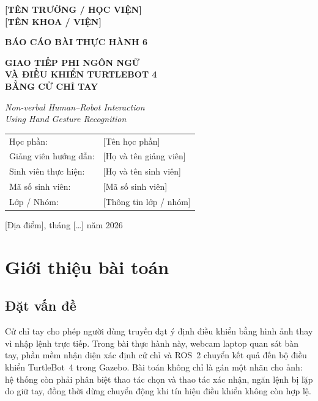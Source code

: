 \documentclass[12pt,a4paper]{article}
\begin{document}
\hypersetup{pageanchor=false}
\begin{titlepage}
\thispagestyle{empty}
\centering
{\large\bfseries [TÊN TRƯỜNG / HỌC VIỆN]\\[5pt] [TÊN KHOA / VIỆN]}\par
\vspace{1.5cm}
{\Large\bfseries BÁO CÁO BÀI THỰC HÀNH 6}\par
\vspace{0.7cm}
{\LARGE\bfseries\color{navy} GIAO TIẾP PHI NGÔN NGỮ\\[7pt] VÀ ĐIỀU KHIỂN TURTLEBOT 4\\[7pt] BẰNG CỬ CHỈ TAY}\par
\vspace{0.6cm}
{\large\itshape Non-verbal Human--Robot Interaction\\ Using Hand Gesture Recognition}\par
\vspace{1.6cm}
\begin{tabular}{@{}ll@{}}
Học phần: & [Tên học phần]\\[9pt]
Giảng viên hướng dẫn: & [Họ và tên giảng viên]\\[9pt]
Sinh viên thực hiện: & [Họ và tên sinh viên]\\[9pt]
Mã số sinh viên: & [Mã số sinh viên]\\[9pt]
Lớp / Nhóm: & [Thông tin lớp / nhóm]
\end{tabular}
\vfill
{\large [Địa điểm], tháng [\ldots] năm 2026}\par
\vspace{0.4cm}
\end{titlepage}
\hypersetup{pageanchor=true}
{\setlength{\parskip}{0pt}\renewcommand{\baselinestretch}{0.96}\footnotesize\tableofcontents}
\clearpage
{}

\section{Giới thiệu bài toán}
\subsection{Đặt vấn đề}
Cử chỉ tay cho phép người dùng truyền đạt ý định điều khiển bằng hình ảnh thay vì nhập lệnh trực tiếp. Trong bài thực hành này, webcam laptop quan sát bàn tay, phần mềm nhận diện xác định cử chỉ và ROS~2 chuyển kết quả đến bộ điều khiển TurtleBot~4 trong Gazebo. Bài toán không chỉ là gán một nhãn cho ảnh: hệ thống còn phải phân biệt thao tác chọn và thao tác xác nhận, ngăn lệnh bị lặp do giữ tay, đồng thời dừng chuyển động khi tín hiệu điều khiển không còn hợp lệ.
\end{document}
